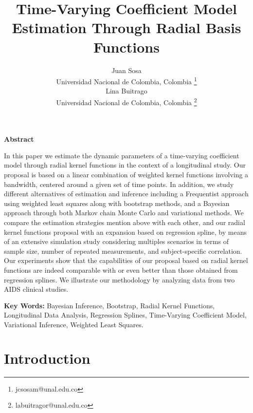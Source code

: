 \documentclass[letterpaper,10pt,openany]{article}
\begin{document}
\title{Time-Varying Coefficient Model Estimation Through Radial Basis Functions}

\author{
	Juan Sosa \\ 
	Universidad Nacional de Colombia, Colombia \footnote{jcsosam@unal.edu.co} \\ 
	Lina Buitrago \\
	Universidad Nacional de Colombia, Colombia \footnote{labuitragor@unal.edu.co}}

\date{}

\maketitle


\begin{center}
	\textbf{Abstract}
\end{center}



In this paper we estimate the dynamic parameters of a time-varying coefficient model through radial kernel functions in the context of a longitudinal study. Our proposal is based on a linear combination of weighted kernel functions involving a bandwidth, centered around a given set of time points. In addition, we study different alternatives of estimation and inference including a Frequentist approach using weighted least squares along with bootstrap methods, and a Bayesian approach through both Markov chain Monte Carlo and variational methods. We compare the estimation strategies mention above with each other, and our radial kernel functions proposal with an expansion based on regression spline, by means of an extensive simulation study considering multiples scenarios in terms of sample size, number of repeated measurements, and subject-specific correlation. Our experiments show that the capabilities of our proposal based on radial kernel functions are indeed comparable with or even better than those obtained from regression splines. We illustrate our methodology by analyzing data from two AIDS clinical studies.


\textbf{Key Words:} Bayesian Inference, Bootstrap, Radial Kernel Functions, Longitudinal Data Analysis, Regression Splines, Time-Varying Coefficient Model, Variational Inference, Weighted Least Squares.


\section{Introduction}\label{sec_introduction}
\end{document}
